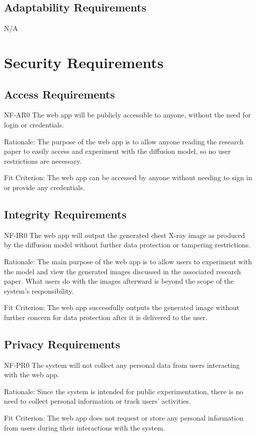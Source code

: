 \documentclass[12pt]{article}
\begin{document}
\subsection{Adaptability Requirements}
N/A

\section{Security Requirements}
\subsection{Access Requirements}
NF-AR0 The web app will be publicly accessible to anyone, without the need for login or 
credentials.

Rationale: The purpose of the web app is to allow anyone reading the research paper to easily 
access and experiment with the diffusion model, so no user restrictions are necessary.

Fit Criterion: The web app can be accessed by anyone without needing to sign in or provide any 
credentials.

\subsection{Integrity Requirements}
NF-IR0 The web app will output the generated chest X-ray image as produced by the diffusion model 
without further data protection or tampering restrictions.

Rationale: The main purpose of the web app is to allow users to experiment with the model and view 
the generated images discussed in the associated research paper. What users do with the images 
afterward is beyond the scope of the system’s responsibility.

Fit Criterion: The web app successfully outputs the generated image without further concern for 
data protection after it is delivered to the user.


\subsection{Privacy Requirements}
NF-PR0 The system will not collect any personal data from users interacting with the web app.

Rationale: Since the system is intended for public experimentation, there is no need to collect 
personal information or track users’ activities.

Fit Criterion: The web app does not request or store any personal information from users during 
their interactions with the system.
\end{document}
